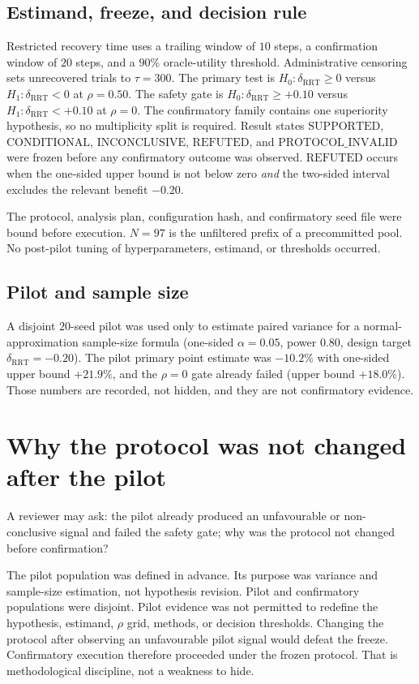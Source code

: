 \documentclass{article}
\newcommand{\rrt}{\mathrm{RRT}}
\newcommand{\deltaRRT}{\delta_{\rrt}}
\begin{document}
\subsection{Estimand, freeze, and decision rule}
Restricted recovery time uses a trailing window of $10$ steps, a confirmation window of $20$ steps, and a $90\%$ oracle-utility threshold.
Administrative censoring sets unrecovered trials to $\tau=300$.
The primary test is $H_0:\deltaRRT\ge 0$ versus $H_1:\deltaRRT<0$ at $\rho=0.50$.
The safety gate is $H_0:\deltaRRT\ge +0.10$ versus $H_1:\deltaRRT<+0.10$ at $\rho=0$.
The confirmatory family contains one superiority hypothesis, so no multiplicity split is required.
Result states $\mathrm{SUPPORTED}$, $\mathrm{CONDITIONAL}$, $\mathrm{INCONCLUSIVE}$, $\mathrm{REFUTED}$, and $\mathrm{PROTOCOL\_INVALID}$ were frozen before any confirmatory outcome was observed.
$\mathrm{REFUTED}$ occurs when the one-sided upper bound is not below zero \emph{and} the two-sided interval excludes the relevant benefit $-0.20$.

The protocol, analysis plan, configuration hash, and confirmatory seed file were bound before execution.
$N=97$ is the unfiltered prefix of a precommitted pool.
No post-pilot tuning of hyperparameters, estimand, or thresholds occurred.

\subsection{Pilot and sample size}
A disjoint $20$-seed pilot was used only to estimate paired variance for a normal-approximation sample-size formula (one-sided $\alpha=0.05$, power $0.80$, design target $\deltaRRT=-0.20$).
The pilot primary point estimate was $-10.2\%$ with one-sided upper bound $+21.9\%$, and the $\rho=0$ gate already failed (upper bound $+18.0\%$).
Those numbers are recorded, not hidden, and they are not confirmatory evidence.

\section{Why the protocol was not changed after the pilot}

A reviewer may ask: the pilot already produced an unfavourable or non-conclusive signal and failed the safety gate; why was the protocol not changed before confirmation?

The pilot population was defined in advance.
Its purpose was variance and sample-size estimation, not hypothesis revision.
Pilot and confirmatory populations were disjoint.
Pilot evidence was not permitted to redefine the hypothesis, estimand, $\rho$ grid, methods, or decision thresholds.
Changing the protocol after observing an unfavourable pilot signal would defeat the freeze.
Confirmatory execution therefore proceeded under the frozen protocol.
That is methodological discipline, not a weakness to hide.
\end{document}

